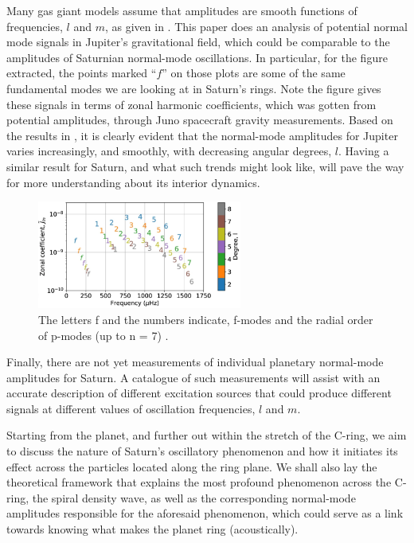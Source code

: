 \documentclass{article}
\begin{document}
Many gas giant models assume that amplitudes are smooth functions of frequencies, $l$ and $m$, as given in \cite{PMID:36042221}. This paper does an analysis of potential normal mode signals in Jupiter’s gravitational field, which could be comparable to the amplitudes of Saturnian normal-mode oscillations. In particular, for the figure extracted, the points marked $“f”$ on those plots are some of the same fundamental modes we are looking at in Saturn’s rings. Note the figure gives these signals in terms of zonal harmonic coefficients, which was gotten from potential amplitudes, through Juno spacecraft gravity measurements. Based on the results in \cite{PMID:36042221}, it is clearly evident that the normal-mode amplitudes for Jupiter varies increasingly, and smoothly, with decreasing angular degrees, $l$. Having a similar result for Saturn, and what such trends might look like, will pave the way for more understanding about its interior dynamics.
\begin{figure}[h] 
\centering
\includegraphics[width=0.6\textwidth]{durante.png}
\caption{The letters f and the numbers indicate, f-modes and the radial order of p-modes (up to n = 7) \cite{PMID:36042221}.} \label{fig:my_label}
\end{figure}

Finally, there are not yet measurements of individual planetary normal-mode amplitudes for Saturn. A catalogue of such measurements will assist with an accurate description of different excitation sources that could produce different signals at different values of oscillation frequencies, $l$ and $m$.


Starting from the planet, and further out within the stretch of the C-ring, we aim to discuss the nature of Saturn's oscillatory phenomenon and how it initiates its effect across the particles located along the ring plane. We shall also lay the theoretical framework that explains the most profound phenomenon across the C-ring, the spiral density wave, as well as the corresponding normal-mode amplitudes responsible for the aforesaid phenomenon, which could serve as a link towards knowing what makes the planet ring (acoustically).
\end{document}
